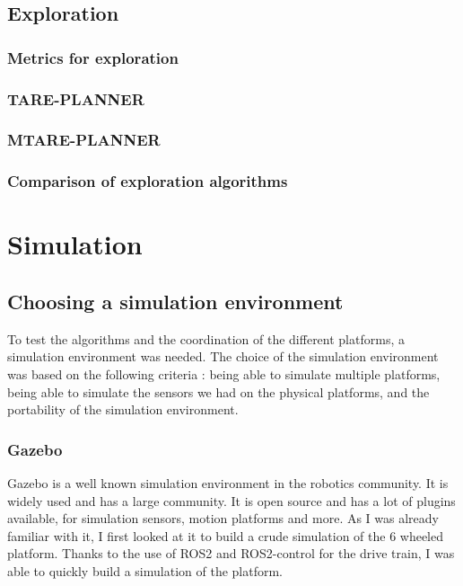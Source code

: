 \documentclass[11pt]{article}
\begin{document}
    \subsection{Exploration}
        \subsubsection{Metrics for exploration}
        \subsubsection{TARE-PLANNER}
        \subsubsection{MTARE-PLANNER}
        \subsubsection{Comparison of exploration algorithms}


\newpage
\section{Simulation}
    \subsection{Choosing a simulation environment}

        To test the algorithms and the coordination of the different platforms, a simulation environment was needed. The choice of the simulation environment was based on the following criteria : being able to simulate multiple platforms, being able to simulate the sensors we had on the physical platforms, and the portability of the simulation environment.


        \subsubsection{Gazebo}
            Gazebo is a well known simulation environment in the robotics community. It is widely used and has a large community. It is open source and has a lot of plugins available, for simulation sensors, motion platforms and more. As I was already familiar with it, I first looked at it to build a crude simulation of the 6 wheeled platform. Thanks to the use of ROS2 and ROS2-control for the drive train, I was able to quickly build a simulation of the platform. 
\end{document}
